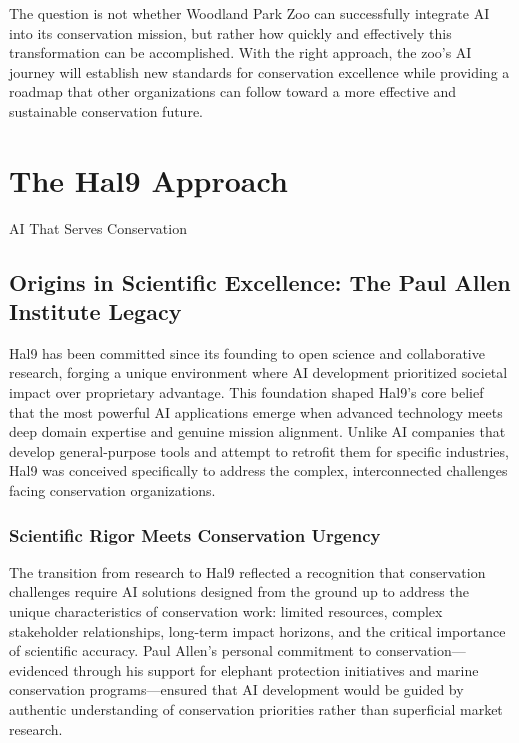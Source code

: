 \documentclass[
  Letterpaper,
]{scrbook}
\begin{document}
The question is not whether Woodland Park Zoo can successfully integrate
AI into its conservation mission, but rather how quickly and effectively
this transformation can be accomplished. With the right approach, the
zoo's AI journey will establish new standards for conservation
excellence while providing a roadmap that other organizations can follow
toward a more effective and sustainable conservation future.


\chapter{The Hal9 Approach}\label{the-hal9-approach}

AI That Serves Conservation

\hfill\break

\section{Origins in Scientific Excellence: The Paul Allen Institute
Legacy}\label{origins-in-scientific-excellence-the-paul-allen-institute-legacy}

Hal9 has been committed since its founding to open science and
collaborative research, forging a unique environment where AI
development prioritized societal impact over proprietary advantage. This
foundation shaped Hal9's core belief that the most powerful AI
applications emerge when advanced technology meets deep domain expertise
and genuine mission alignment. Unlike AI companies that develop
general-purpose tools and attempt to retrofit them for specific
industries, Hal9 was conceived specifically to address the complex,
interconnected challenges facing conservation organizations.

\subsection{Scientific Rigor Meets Conservation
Urgency}\label{scientific-rigor-meets-conservation-urgency}

The transition from research to Hal9 reflected a recognition that
conservation challenges require AI solutions designed from the ground up
to address the unique characteristics of conservation work: limited
resources, complex stakeholder relationships, long-term impact horizons,
and the critical importance of scientific accuracy. Paul Allen's
personal commitment to conservation---evidenced through his support for
elephant protection initiatives and marine conservation
programs---ensured that AI development would be guided by authentic
understanding of conservation priorities rather than superficial market
research.
\end{document}
